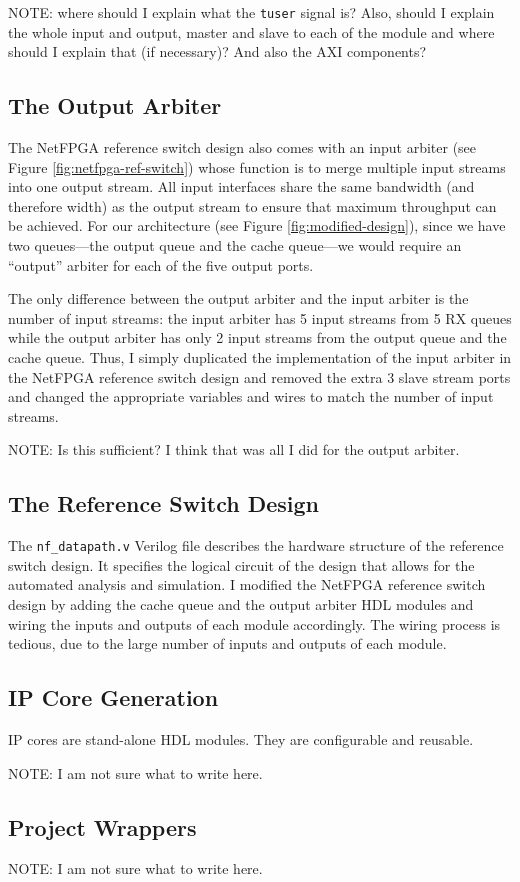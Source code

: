 NOTE: where should I explain what the \texttt{tuser} signal is? Also, should I explain the whole input and output, master and slave to each of the module and where should I explain that (if necessary)? And also the AXI components?

	\subsection{The Output Arbiter}
The NetFPGA reference switch design also comes with an input arbiter (see Figure \ref{fig:netfpga-ref-switch}) whose function is to merge multiple input streams into one output stream. All input interfaces share the same bandwidth (and therefore width) as the output stream to ensure that maximum throughput can be achieved. For our architecture (see Figure \ref{fig:modified-design}), since we have two queues---the output queue and the cache queue---we would require an ``output'' arbiter for each of the five output ports. 

The only difference between the output arbiter and the input arbiter is the number of input streams: the input arbiter has 5 input streams from 5 RX queues while the output arbiter has only 2 input streams from the output queue and the cache queue. Thus, I simply duplicated the implementation of the input arbiter in the NetFPGA reference switch design and removed the extra 3 slave stream ports and changed the appropriate variables and wires to match the number of input streams.

NOTE: Is this sufficient? I think that was all I did for the output arbiter.

	\subsection{The Reference Switch Design}

The \verb|nf_datapath.v| Verilog file describes the hardware structure of the reference switch design. It specifies the logical circuit of the design that allows for the automated analysis and simulation. I modified the NetFPGA reference switch design by adding the cache queue and the output arbiter HDL modules and wiring the inputs and outputs of each module accordingly. The wiring process is tedious, due to the large number of inputs and outputs of each module.
	
	\subsection{IP Core Generation}
IP cores are stand-alone HDL modules. They are configurable and reusable.

NOTE: I am not sure what to write here.
	\subsection{Project Wrappers}
NOTE: I am not sure what to write here.


